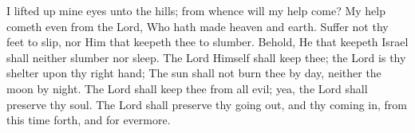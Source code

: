 I lifted up mine eyes unto the hills; from whence will my help come? My help cometh even from the Lord, Who hath made heaven and earth. Suffer not thy feet to slip, nor Him that keepeth thee to slumber. Behold, He that keepeth Israel shall neither slumber nor sleep. The Lord Himself shall keep thee; the Lord is thy shelter upon thy right hand; The sun shall not burn thee by day, neither the moon by night. The Lord shall keep thee from all evil; yea, the Lord shall preserve thy soul. The Lord shall preserve thy going out, and thy coming in, from this time forth, and for evermore.
